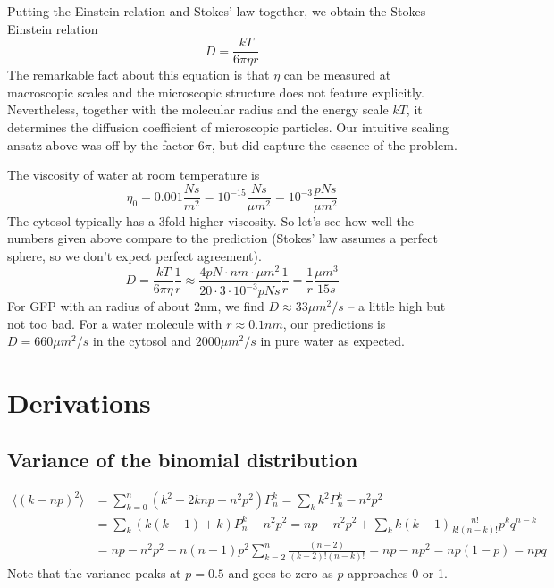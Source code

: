 Putting the Einstein relation and Stokes' law together, we obtain the Stokes-Einstein relation
\begin{equation}
D = \frac{kT}{6\pi \eta r}
\end{equation}
The remarkable fact about this equation is that $\eta$ can be measured at macroscopic scales and the microscopic structure does not feature explicitly. Nevertheless, together with the molecular radius and the energy scale $kT$, it determines the diffusion coefficient of microscopic particles.
Our intuitive scaling ansatz above was off by the factor $6\pi$, but did capture the essence of the problem.

The viscosity of water at room temperature is
\begin{equation}
\eta_0 = 0.001\frac{N s}{m^2} = 10^{-15}\frac{N s}{\mu m^2} = 10^{-3}\frac{pN s}{\mu m^2}
\end{equation}
The cytosol typically has a 3fold higher viscosity. So let's see how well the numbers given above compare to the prediction (Stokes' law assumes a perfect sphere, so we don't expect perfect agreement).
\begin{equation}
D = \frac{kT}{6\pi \eta} \frac{1}{r} \approx \frac{4pN \cdot nm \cdot \mu m^2}{20\cdot 3\cdot 10^{-3} pN s}\frac{1}{r} = \frac{1}{r} \frac{\mu m^3}{15s}
\end{equation}
For GFP with an radius of about 2nm, we find $D\approx 33 \mu m^2/s$ -- a little high but not too bad. For a water molecule with $r\approx 0.1 nm$, our predictions is $D = 660\mu m^2/s$ in the cytosol and $2000\mu m^2/s$ in pure water as expected.



\section{Derivations}

\subsection*{Variance of the binomial distribution}
\begin{equation}
	\begin{split}
	\langle (k - np)^2 \rangle & = \sum_{k=0}^n (k^2 - 2knp + n^2 p^2) P_n^k = \sum_k k^2 P_n^k - n^2p^2 \\ &
	= \sum_k (k(k-1) + k) P_n^k - n^2p^2 = np -n^2 p^2 + \sum_k k(k-1)\frac{n!}{k!(n-k)!}p^k q^{n-k} \\
	&= np - n^2 p^2 + n(n-1) p^2 \sum_{k=2}^n \frac{(n-2)}{(k-2)!(n-k)!} = np-np^2 = np(1-p) = npq
	\end{split}
\end{equation}
Note that the variance peaks at $p=0.5$ and goes to zero as $p$ approaches 0 or 1.


